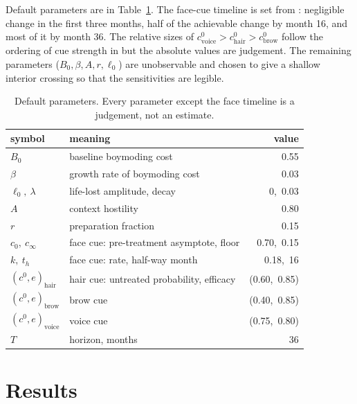 \documentclass[11pt,a4paper]{article}
\theoremstyle{remark}
\begin{document}
Default parameters are in Table~\ref{tab:params}. The face-cue timeline is set from \cite{hembree2017}: negligible change in the first three months, half of the achievable change by month 16, and most of it by month 36. The relative sizes of $c^0_{\mathrm{voice}}>c^0_{\mathrm{hair}}>c^0_{\mathrm{brow}}$ follow the ordering of cue strength in \cite{brown1993,gelfer2005} but the absolute values are judgement. The remaining parameters ($B_0,\beta,A,r,\ell_0$) are unobservable and chosen to give a shallow interior crossing so that the sensitivities are legible.

\begin{table}[t]
  \centering
  \caption{Default parameters. Every parameter except the face timeline is a judgement, not an estimate.}
  \label{tab:params}
  \begin{tabular}{llr}
    \toprule
    symbol & meaning & value \\
    \midrule
    $B_0$ & baseline boymoding cost & 0.55 \\
    $\beta$ & growth rate of boymoding cost & 0.03 \\
    $\ell_0,\ \lambda$ & life-lost amplitude, decay & 0,\ 0.03 \\
    $A$ & context hostility & 0.80 \\
    $r$ & preparation fraction & 0.15 \\
    $c_0,\ c_\infty$ & face cue: pre-treatment asymptote, floor & 0.70,\ 0.15 \\
    $k,\ t_h$ & face cue: rate, half-way month & 0.18,\ 16 \\
    $(c^0,e)_{\mathrm{hair}}$ & hair cue: untreated probability, efficacy & (0.60,\ 0.85) \\
    $(c^0,e)_{\mathrm{brow}}$ & brow cue & (0.40,\ 0.85) \\
    $(c^0,e)_{\mathrm{voice}}$ & voice cue & (0.75,\ 0.80) \\
    $T$ & horizon, months & 36 \\
    \bottomrule
  \end{tabular}
\end{table}

\section{Results}
\label{sec:results}
\end{document}
